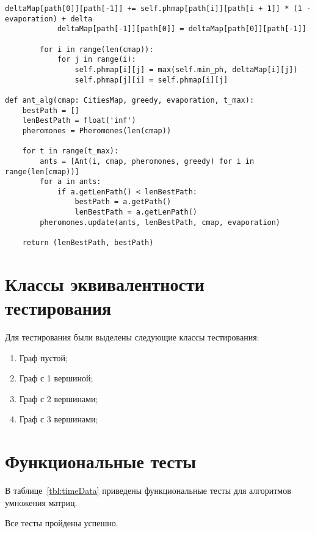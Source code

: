 \begin{center}
\begin{lstlisting}[label=lst:lst2, caption=Реализация муравьиного алгоритма]
			deltaMap[path[0]][path[-1]] += self.phmap[path[i]][path[i + 1]] * (1 - evaporation) + delta
			deltaMap[path[-1]][path[0]] = deltaMap[path[0]][path[-1]]

		for i in range(len(cmap)):
			for j in range(i):
				self.phmap[i][j] = max(self.min_ph, deltaMap[i][j])
				self.phmap[j][i] = self.phmap[i][j]

def ant_alg(cmap: CitiesMap, greedy, evaporation, t_max):
	bestPath = []
	lenBestPath = float('inf')
	pheromones = Pheromones(len(cmap))
	
	for t in range(t_max):
		ants = [Ant(i, cmap, pheromones, greedy) for i in range(len(cmap))]
		for a in ants:
			if a.getLenPath() < lenBestPath:
				bestPath = a.getPath()
				lenBestPath = a.getLenPath()
		pheromones.update(ants, lenBestPath, cmap, evaporation)

	return (lenBestPath, bestPath)
	\end{lstlisting}
\end{center}


\section{Классы эквивалентности тестирования}

Для тестирования были выделены следующие классы тестирования:
\begin{enumerate}
	\item {Граф пустой};
	\item {Граф с 1 вершиной};
	\item {Граф с 2 вершинами};
	\item {Граф с 3 вершинами};
\end{enumerate}

\section{Функциональные тесты}
В таблице~\ref{tbl:timeData} приведены функциональные тесты для алгоритмов умножения матриц.

Все тесты пройдены успешно.


